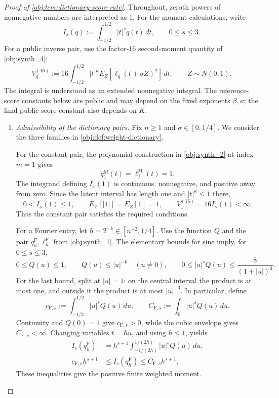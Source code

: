 \documentclass[11pt]{article}
\begin{document}
\begin{proof}[Proof of \cref{obj:lem:dictionary-score-rate}]
Throughout, zeroth powers of nonnegative numbers are interpreted as \(1\). For the moment calculations, write
\[
I_s(q):=\int_{-1/2}^{1/2}|t|^s q(t)\,dt,
\qquad 0\le s\le3.
\]
For a public inverse pair, use the factor-\(16\) second-moment quantity of \cref{obj:synth_4}:
\[
V_q^{(16)}:=16\int_{-1/2}^{1/2}|t|^\kappa
E_Z[\ell_q(t+\sigma Z)^2]\,dt,
\qquad Z\sim N(0,1).
\]
The integral is understood as an extended nonnegative integral. The reference-score constants below are public and may depend on the fixed exponents \(\beta,\kappa\); the final public-score constant also depends on \(K\).

\begin{enumerate}
\item \emph{Admissibility of the dictionary pairs.}
Fix \(n\ge1\) and \(\sigma\in[0,1/4]\). We consider the three families in \cref{obj:def:weight-dictionary}.

For the constant pair, the polynomial construction in \cref{obj:synth_2} at index \(m=1\) gives
\[
q_1^{\mathrm M}(t)=\ell_1^{\mathrm M}(t)=1.
\]
The integrand defining \(I_\kappa(1)\) is continuous, nonnegative, and positive away from zero. Since the latent interval has length one and \(|t|^\kappa\le1\) there,
\[
0<I_\kappa(1)\le1,
\qquad
E_Z[|1|]=E_Z[1]=1,
\qquad
V_1^{(16)}=16I_\kappa(1)<\infty.
\]
Thus the constant pair satisfies the required conditions.

For a Fourier entry, let \(h=2^{-k}\in[n^{-2},1/4]\). Use the function \(Q\) and the pair \(q_h^{\mathrm F},\ell_h^{\mathrm F}\) from \cref{obj:synth_1}. The elementary bounds for sine imply, for \(0\le s\le3\),
\[
0\le Q(u)\le1,
\qquad
Q(u)\le |u|^{-6}\quad(u\ne0),
\qquad
0\le |u|^sQ(u)\le\frac{8}{(1+|u|)^3}.
\]
For the last bound, split at \(|u|=1\): on the central interval the product is at most one, and outside it the product is at most \(|u|^{-3}\). In particular, define
\[
c_{\mathrm F,s}:=\int_{-1/2}^{1/2}|u|^sQ(u)\,du,
\qquad
C_{\mathrm F,s}:=\int_{\mathbb R}|u|^sQ(u)\,du.
\]
Continuity and \(Q(0)=1\) give \(c_{\mathrm F,s}>0\), while the cubic envelope gives \(C_{\mathrm F,s}<\infty\). Changing variables \(t=hu\), and using \(h\le1\), yields
\[
\begin{aligned}
I_s(q_h^{\mathrm F})
&=h^{s+1}
  \int_{-1/(2h)}^{1/(2h)}|u|^sQ(u)\,du,\\
c_{\mathrm F,s}h^{s+1}
&\le I_s(q_h^{\mathrm F})
 \le C_{\mathrm F,s}h^{s+1}.
\end{aligned}
\]
These inequalities give the positive finite weighted moment.


\end{enumerate}
\end{proof}
\end{document}
